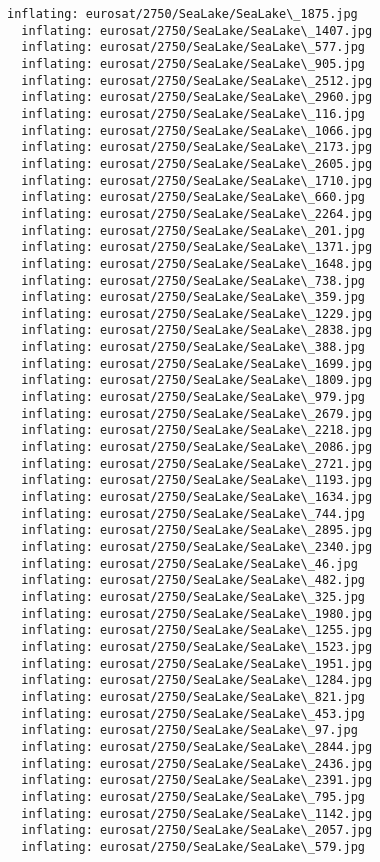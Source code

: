 \documentclass[11pt]{article}
\begin{document}
\begin{Verbatim}[commandchars=\\\{\}]
  inflating: eurosat/2750/SeaLake/SeaLake\_1875.jpg
  inflating: eurosat/2750/SeaLake/SeaLake\_1407.jpg
  inflating: eurosat/2750/SeaLake/SeaLake\_577.jpg
  inflating: eurosat/2750/SeaLake/SeaLake\_905.jpg
  inflating: eurosat/2750/SeaLake/SeaLake\_2512.jpg
  inflating: eurosat/2750/SeaLake/SeaLake\_2960.jpg
  inflating: eurosat/2750/SeaLake/SeaLake\_116.jpg
  inflating: eurosat/2750/SeaLake/SeaLake\_1066.jpg
  inflating: eurosat/2750/SeaLake/SeaLake\_2173.jpg
  inflating: eurosat/2750/SeaLake/SeaLake\_2605.jpg
  inflating: eurosat/2750/SeaLake/SeaLake\_1710.jpg
  inflating: eurosat/2750/SeaLake/SeaLake\_660.jpg
  inflating: eurosat/2750/SeaLake/SeaLake\_2264.jpg
  inflating: eurosat/2750/SeaLake/SeaLake\_201.jpg
  inflating: eurosat/2750/SeaLake/SeaLake\_1371.jpg
  inflating: eurosat/2750/SeaLake/SeaLake\_1648.jpg
  inflating: eurosat/2750/SeaLake/SeaLake\_738.jpg
  inflating: eurosat/2750/SeaLake/SeaLake\_359.jpg
  inflating: eurosat/2750/SeaLake/SeaLake\_1229.jpg
  inflating: eurosat/2750/SeaLake/SeaLake\_2838.jpg
  inflating: eurosat/2750/SeaLake/SeaLake\_388.jpg
  inflating: eurosat/2750/SeaLake/SeaLake\_1699.jpg
  inflating: eurosat/2750/SeaLake/SeaLake\_1809.jpg
  inflating: eurosat/2750/SeaLake/SeaLake\_979.jpg
  inflating: eurosat/2750/SeaLake/SeaLake\_2679.jpg
  inflating: eurosat/2750/SeaLake/SeaLake\_2218.jpg
  inflating: eurosat/2750/SeaLake/SeaLake\_2086.jpg
  inflating: eurosat/2750/SeaLake/SeaLake\_2721.jpg
  inflating: eurosat/2750/SeaLake/SeaLake\_1193.jpg
  inflating: eurosat/2750/SeaLake/SeaLake\_1634.jpg
  inflating: eurosat/2750/SeaLake/SeaLake\_744.jpg
  inflating: eurosat/2750/SeaLake/SeaLake\_2895.jpg
  inflating: eurosat/2750/SeaLake/SeaLake\_2340.jpg
  inflating: eurosat/2750/SeaLake/SeaLake\_46.jpg
  inflating: eurosat/2750/SeaLake/SeaLake\_482.jpg
  inflating: eurosat/2750/SeaLake/SeaLake\_325.jpg
  inflating: eurosat/2750/SeaLake/SeaLake\_1980.jpg
  inflating: eurosat/2750/SeaLake/SeaLake\_1255.jpg
  inflating: eurosat/2750/SeaLake/SeaLake\_1523.jpg
  inflating: eurosat/2750/SeaLake/SeaLake\_1951.jpg
  inflating: eurosat/2750/SeaLake/SeaLake\_1284.jpg
  inflating: eurosat/2750/SeaLake/SeaLake\_821.jpg
  inflating: eurosat/2750/SeaLake/SeaLake\_453.jpg
  inflating: eurosat/2750/SeaLake/SeaLake\_97.jpg
  inflating: eurosat/2750/SeaLake/SeaLake\_2844.jpg
  inflating: eurosat/2750/SeaLake/SeaLake\_2436.jpg
  inflating: eurosat/2750/SeaLake/SeaLake\_2391.jpg
  inflating: eurosat/2750/SeaLake/SeaLake\_795.jpg
  inflating: eurosat/2750/SeaLake/SeaLake\_1142.jpg
  inflating: eurosat/2750/SeaLake/SeaLake\_2057.jpg
  inflating: eurosat/2750/SeaLake/SeaLake\_579.jpg

\end{Verbatim}
\end{document}
